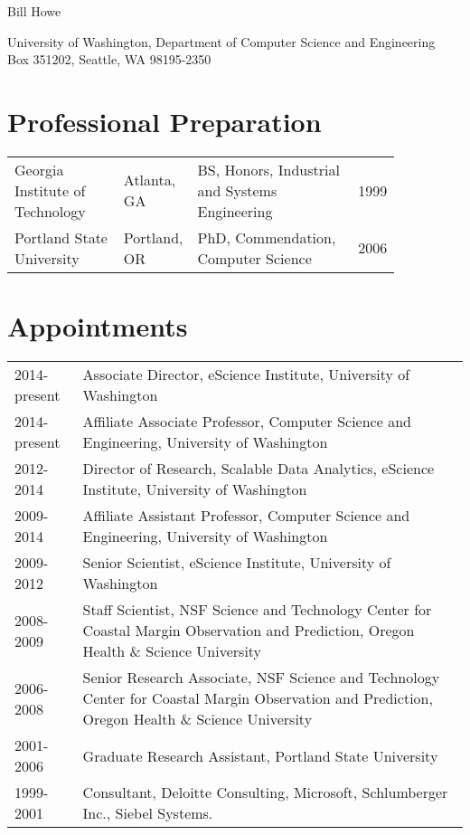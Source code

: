 \documentclass[10pt]{article}
\begin{document}
\begin{cv}{}

\centerline{\Large Bill Howe}
\vspace{0.5cm}

\noindent University of Washington, Department of Computer Science and Engineering \\
\noindent Box 351202, Seattle, WA 98195-2350 

\section*{Professional Preparation}
\noindent
\begin{tabular}{p{0.30\linewidth}p{.15\linewidth}p{0.45\linewidth}p{0.10\linewidth}}
Georgia Institute of Technology &  Atlanta, GA & BS, Honors, Industrial and Systems Engineering & 1999 \\
Portland State University & Portland, OR & PhD, Commendation, Computer Science & 2006 \\
\end{tabular}

\section*{Appointments}
\noindent
\begin{tabular}{p{0.15\linewidth}p{0.85\linewidth}}

2014-present & Associate Director, eScience Institute, University of Washington \\
2014-present & Affiliate Associate Professor, Computer Science and Engineering, University of Washington \\
2012-2014 & Director of Research, Scalable Data Analytics, eScience Institute, University of Washington \\
2009-2014 & Affiliate Assistant Professor, Computer Science and Engineering, University of Washington \\
2009-2012 & Senior Scientist, eScience Institute, University of Washington \\
2008-2009 & Staff Scientist, NSF Science and Technology Center for Coastal Margin Observation and  Prediction, Oregon Health \& Science University \\
2006-2008 & Senior Research Associate, NSF Science and Technology Center for Coastal Margin Observation and  Prediction, Oregon Health \& Science University \\
2001-2006 & Graduate Research Assistant, Portland State University \\
1999-2001 & Consultant, Deloitte Consulting, Microsoft, Schlumberger Inc., Siebel Systems. \\
\end{tabular}


\end{cv}
\end{document}
